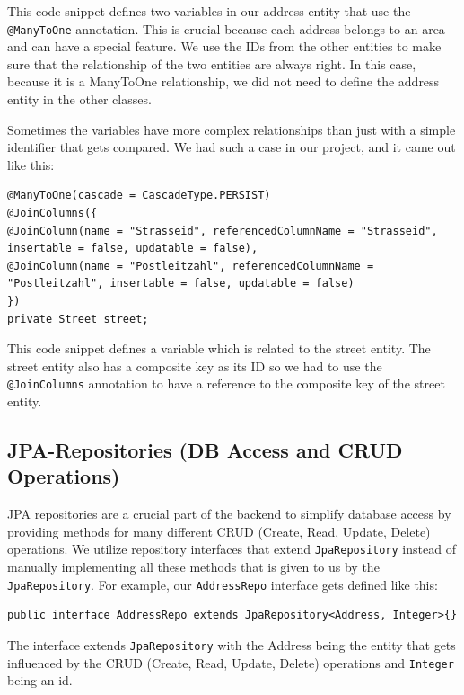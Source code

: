     This code snippet defines two variables in our address entity that use the \texttt{@ManyToOne} annotation. This is crucial because each address belongs to an area and can have a special feature. We use the IDs from the other entities to make sure that the relationship of the two entities are always right. In this case, because it is a ManyToOne relationship, we did not need to define the address entity in the other classes. \newline

    Sometimes the variables have more complex relationships than just with a simple identifier that gets compared. We had such a case in our project, and it came out like this: 
    \lstset{style=mycsharp, caption=Complex ManyToOne Variable}
    \begin{lstlisting}
@ManyToOne(cascade = CascadeType.PERSIST)
@JoinColumns({
@JoinColumn(name = "Strasseid", referencedColumnName = "Strasseid", insertable = false, updatable = false),
@JoinColumn(name = "Postleitzahl", referencedColumnName = "Postleitzahl", insertable = false, updatable = false)
})
private Street street;                   
    \end{lstlisting} 
    This code snippet defines a variable which is related to the street entity. The street entity also has a composite key as its ID so we had to use the \texttt{@JoinColumns} annotation to have a reference to the composite key of the street entity. 

    \subsection{JPA-Repositories (DB Access and CRUD Operations)}
    JPA repositories are a crucial part of the backend to simplify database access by providing methods for many different CRUD (Create, Read, Update, Delete) operations. We utilize repository interfaces that extend \texttt{JpaRepository} instead of manually implementing all these methods that is given to us by the \texttt{JpaRepository}. For example, our \texttt{AddressRepo} interface gets defined like this:  \newline
    \lstset{style=mycsharp, caption=AddressRepo Interface}
    \begin{lstlisting}
public interface AddressRepo extends JpaRepository<Address, Integer>{}          
    \end{lstlisting} 
    The interface extends \texttt{JpaRepository} with the Address being the entity that gets influenced by the CRUD (Create, Read, Update, Delete) operations and \texttt{Integer} being an id. \newline

